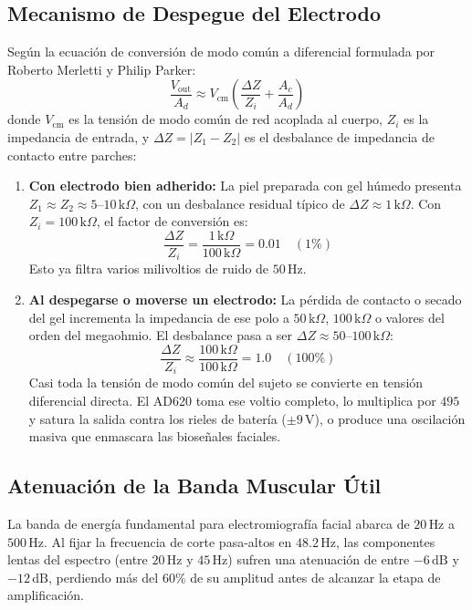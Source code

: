 \documentclass[11pt,a4paper]{article}
\begin{document}
\subsection{Mecanismo de Despegue del Electrodo}
Según la ecuación de conversión de modo común a diferencial formulada por Roberto Merletti y Philip Parker:
\begin{equation}
\frac{V_{\text{out}}}{A_d} \approx V_{\text{cm}} \left( \frac{\Delta Z}{Z_i} + \frac{A_c}{A_d} \right)
\end{equation}
donde $V_{\text{cm}}$ es la tensión de modo común de red acoplada al cuerpo, $Z_i$ es la impedancia de entrada, y $\Delta Z = |Z_1 - Z_2|$ es el desbalance de impedancia de contacto entre parches:
\begin{enumerate}
    \item \textbf{Con electrodo bien adherido:} La piel preparada con gel húmedo presenta $Z_1 \approx Z_2 \approx 5\text{--}10\,\text{k}\Omega$, con un desbalance residual típico de $\Delta Z \approx 1\,\text{k}\Omega$. Con $Z_i = 100\,\text{k}\Omega$, el factor de conversión es:
    \begin{equation}
    \frac{\Delta Z}{Z_i} = \frac{1\,\text{k}\Omega}{100\,\text{k}\Omega} = 0.01 \quad (1\%)
    \end{equation}
    Esto ya filtra varios milivoltios de ruido de $50\,\text{Hz}$.
    \item \textbf{Al despegarse o moverse un electrodo:} La pérdida de contacto o secado del gel incrementa la impedancia de ese polo a $50\,\text{k}\Omega$, $100\,\text{k}\Omega$ o valores del orden del megaohmio. El desbalance pasa a ser $\Delta Z \approx 50\text{--}100\,\text{k}\Omega$:
    \begin{equation}
    \frac{\Delta Z}{Z_i} \approx \frac{100\,\text{k}\Omega}{100\,\text{k}\Omega} = 1.0 \quad (100\%)
    \end{equation}
    Casi toda la tensión de modo común del sujeto se convierte en tensión diferencial directa. El AD620 toma ese voltio completo, lo multiplica por $495$ y satura la salida contra los rieles de batería ($\pm 9\,\text{V}$), o produce una oscilación masiva que enmascara las bioseñales faciales.
\end{enumerate}

\subsection{Atenuación de la Banda Muscular Útil}
La banda de energía fundamental para electromiografía facial abarca de $20\,\text{Hz}$ a $500\,\text{Hz}$. Al fijar la frecuencia de corte pasa-altos en $48.2\,\text{Hz}$, las componentes lentas del espectro (entre $20\,\text{Hz}$ y $45\,\text{Hz}$) sufren una atenuación de entre $-6\,\text{dB}$ y $-12\,\text{dB}$, perdiendo más del 60\% de su amplitud antes de alcanzar la etapa de amplificación.
\end{document}
